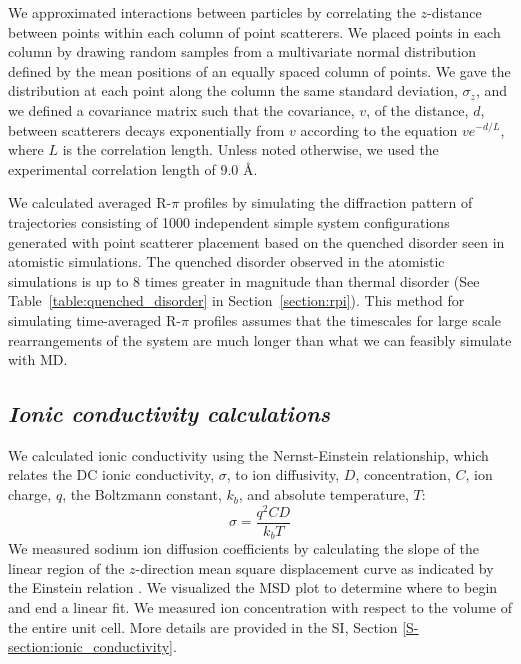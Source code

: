 \documentclass[journal=jpcbfk,manuscript=article]{achemso}
\begin{document}
  We approximated interactions between particles by correlating the $z$-distance 
  between points within each column of point scatterers. We placed points in each
  column by drawing random samples from a multivariate normal distribution defined
  by the mean positions of an equally spaced column of points. We gave the 
  distribution at each point along the column the same standard deviation, 
  $\sigma_z$, and we defined a covariance matrix such that the covariance, $v$, of
  the distance, $d$, between scatterers decays exponentially from $v$ according
  to the equation $ve^{-d/L}$, where $L$ is the correlation length. Unless noted
  otherwise, we used the experimental correlation length of 9.0 \AA. 
  
  We calculated averaged R-$\pi$ profiles by simulating the diffraction pattern
  of trajectories consisting of 1000 independent simple system configurations 
  generated with point scatterer placement based on the quenched disorder seen in
  atomistic simulations. The quenched disorder observed in the atomistic simulations
  is up to 8 times greater in magnitude than thermal disorder (See Table~\ref{table:quenched_disorder}
  in Section~\ref{section:rpi}). This method for simulating time-averaged R-$\pi$ profiles
  assumes that the timescales for large scale rearrangements of the
  system are much longer than what we can feasibly simulate with MD.

  \subsection{\textit{Ionic conductivity calculations}}\label{method:ionic_conductivity}

  We calculated ionic conductivity using the Nernst-Einstein relationship, which 
  relates the DC ionic conductivity, $\sigma$, to ion diffusivity, $D$, 
  concentration, $C$, ion charge, $q$, the Boltzmann constant, $k_b$, and 
  absolute temperature, $T$: 
  \begin{equation}
	\sigma = \dfrac{q^2CD}{k_b T} 
	\label{eqn:nernst_einstein}
  \end{equation}
  We measured sodium ion diffusion coefficients by calculating the slope
  of the linear region of the $z$-direction mean square displacement curve as
  indicated by the Einstein relation \cite{einstein_investigations_1956}. We
  visualized the MSD plot to determine where to begin and end a linear fit. We
  measured ion concentration with respect to the volume of the entire unit cell. 
  More details are provided in the SI, Section \ref{S-section:ionic_conductivity}.
\end{document}
